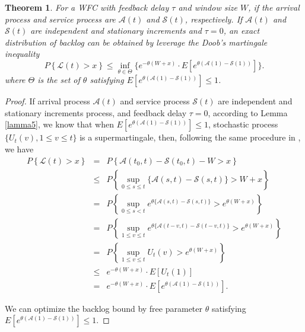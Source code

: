 \documentclass[paper]{ieice}
\newtheorem{theorem}{Theorem}
\newtheorem{proof}{Proof}
\begin{document}
\begin{theorem}\label{theorem3}
For a WFC with feedback delay $\tau$ and window size $W$, if the arrival process and service process are $\mathcal{A}(t)$ and $\mathcal{S}(t)$, respectively. If $\mathcal{A}(t)$ and $\mathcal{S}(t)$ are independent and stationary increments and $\tau=0$, an exact distribution of backlog can be obtained by leverage the Doob's martingale inequality
\begin{equation}\label{eqn3}
P\left\{\mathcal{L}(t)>x\right\}\leq \inf_{\theta\in\Theta}\{e^{-\theta(W+x)}\cdot E[e^{\theta(\mathcal{A}(1)-\mathcal{S}(1))}]\}.
\end{equation}
where $\Theta$ is the set of $\theta$ satisfying $E[e^{\theta(\mathcal{A}(1)-\mathcal{S}(1))}]\leq 1$.
\end{theorem}
\begin{proof}
If arrival process $\mathcal{A}(t)$ and service process $\mathcal{S}(t)$ are independent and stationary increments process, and feedback delay $\tau=0$, according to Lemma \ref{lamma5}, we know that when $E[e^{\theta(\mathcal{A}(1)-\mathcal{S}(1))}]\leq 1$, stochastic process $\{U_{t}(v),1\leq v\leq t\}$ is a supermartingale, then, following the same procedure in \cite{Ciucu2007Network}\cite{jiang2009network}, we have
\begin{eqnarray*}
P\left\{\mathcal{L}(t)>x\right\}  &=&P\left\{\mathcal{A}(t_{0},t)-\mathcal{S}(t_{0},t)-W>x\right\}\\
  &\leq& P\left\{\sup_{0\leq s\leq t}\{\mathcal{A}(s,t)-\mathcal{S}(s,t)\}>W+x\right\}\\
  &=& P\left\{\sup_{0\leq s< t}e^{\theta\{\mathcal{A}(s,t)-\mathcal{S}(s,t)\}}>e^{\theta(W+x)}\right\}\\
  &=& P\left\{\sup_{1\leq v\leq t}e^{\theta\{\mathcal{A}(t-v,t)-\mathcal{S}(t-v,t)\}}>e^{\theta(W+x)}\right\}\\
  &=& P\left\{\sup_{1\leq v\leq t}U_{t}(v)>e^{\theta(W+x)}\right\}\\
  &\leq& e^{-\theta(W+x)}\cdot E[U_{t}(1)]\\
  &=& e^{-\theta(W+x)}\cdot E[e^{\theta(\mathcal{A}(1)-\mathcal{S}(1))}].
\end{eqnarray*}

We can optimize the backlog bound by free parameter $\theta$ satisfying $E[e^{\theta(\mathcal{A}(1)-\mathcal{S}(1))}]\leq 1$.\QED
\end{proof}
\end{document}
